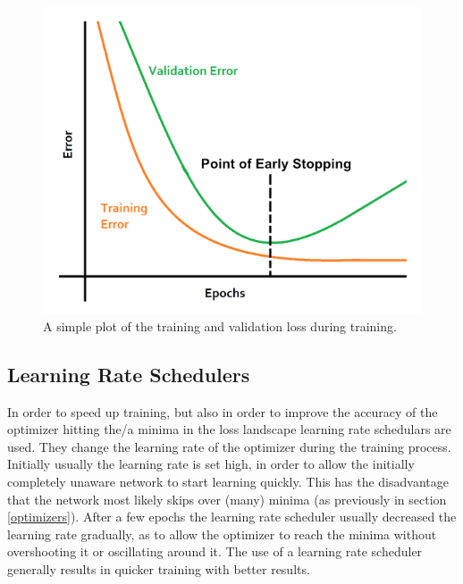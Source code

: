 \documentclass[a4paper,10pt]{scrartcl}
\begin{document}
\begin{figure}[h]
    \includegraphics[scale=0.4]{images/early-stopping.png}
    \centering
    \caption{A simple plot of the training and validation loss during training.}
    \label{fig:earlystopping}
\end{figure}

\subsection{Learning Rate Schedulers}

In order to speed up training, but also in order to improve the accuracy of the optimizer hitting the/a minima in the loss landscape learning rate schedulars are used.
They change the learning rate of the optimizer during the training process.
Initially usually the learning rate is set high, in order to allow the initially completely unaware network to start learning quickly.
This has the disadvantage that the network most likely skips over (many) minima (as previously in section \ref{optimizers}).
After a few epochs the learning rate scheduler usually decreased the learning rate gradually, as to allow the optimizer to reach the minima without overshooting it or oscillating around it.
The use of a learning rate scheduler generally results in quicker training with better results.

\end{document}
